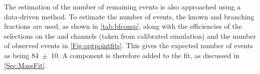 




The estimation of the number of remaining \LbKjpsi events is also approached using a data-driven method. To estimate the number of \LbKjpsi events, the known \LbKjpsi and \Lbpijpsi branching fractions are used, as shown in \autoref{tab:bfcomp}, along with the efficiencies of the \dllkpi selections on the \LbKjpsi and \Lbpijpsi channels (taken from calibrated simulation) and the number of observed \Lbpijpsi events in \autoref{Fig:optpointfits}. This gives the expected number of \LbKjpsi events as being 84~$\pm$~10. A \LbKjpsi component is therefore added to the \Lbpijpsi fit, as discussed in \autoref{Sec:MassFit}. %




